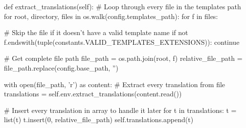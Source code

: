 \begin{pythoncode}
def extract_translations(self):
    # Loop through every file in the templates path
    for root, directory, files in os.walk(config.templates_path):
        for f in files:

            # Skip the file if it doesn't have a valid template name
            if not f.endswith(tuple(constants.VALID_TEMPLATES_EXTENSIONS)):
                continue

            # Get complete file path
            file_path = os.path.join(root, f)
            relative_file_path = file_path.replace(config.base_path, '')

            with open(file_path, 'r') as content:
                # Extract every translation from file
                translations = self.env.extract_translations(content.read())

                # Insert every translation in array to handle it later
                for t in translations:
                    t = list(t)
                    t.insert(0, relative_file_path)
                    self.translations.append(t)
\end{pythoncode}
